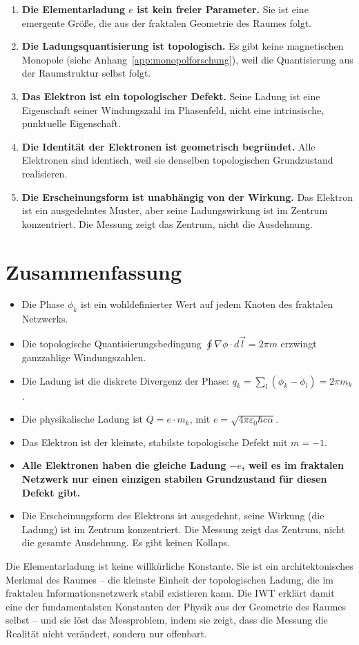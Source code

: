 \begin{enumerate}
    \item \textbf{Die Elementarladung \( e \) ist kein freier Parameter.} Sie ist eine emergente Größe, die aus der fraktalen Geometrie des Raumes folgt.
    \item \textbf{Die Ladungsquantisierung ist topologisch.} Es gibt keine magnetischen Monopole (siehe Anhang~\ref{app:monopolforschung}), weil die Quantisierung aus der Raumstruktur selbst folgt.
    \item \textbf{Das Elektron ist ein topologischer Defekt.} Seine Ladung ist eine Eigenschaft seiner Windungszahl im Phasenfeld, nicht eine intrinsische, punktuelle Eigenschaft.
    \item \textbf{Die Identität der Elektronen ist geometrisch begründet.} Alle Elektronen sind identisch, weil sie denselben topologischen Grundzustand realisieren.
    \item \textbf{Die Erscheinungsform ist unabhängig von der Wirkung.} Das Elektron ist ein ausgedehntes Muster, aber seine Ladungswirkung ist im Zentrum konzentriert. Die Messung zeigt das Zentrum, nicht die Ausdehnung.
\end{enumerate}

\section{Zusammenfassung}
\label{app:phasenquantisierung_zusammenfassung}

\begin{itemize}
    \item Die Phase \( \phi_k \) ist ein wohldefinierter Wert auf jedem Knoten des fraktalen Netzwerks.
    \item Die topologische Quantisierungsbedingung \( \oint \nabla \phi \cdot d\vec{l} = 2\pi m \) erzwingt ganzzahlige Windungszahlen.
    \item Die Ladung ist die diskrete Divergenz der Phase: \( q_k = \sum_l (\phi_k - \phi_l) = 2\pi m_k \).
    \item Die physikalische Ladung ist \( Q = e \cdot m_k \), mit \( e = \sqrt{4\pi\varepsilon_0 \hbar c \alpha} \).
    \item Das Elektron ist der kleinste, stabilste topologische Defekt mit \( m = -1 \).
    \item \textbf{Alle Elektronen haben die gleiche Ladung \( -e \), weil es im fraktalen Netzwerk nur einen einzigen stabilen Grundzustand für diesen Defekt gibt.}
    \item Die Erscheinungsform des Elektrons ist ausgedehnt, seine Wirkung (die Ladung) ist im Zentrum konzentriert. Die Messung zeigt das Zentrum, nicht die gesamte Ausdehnung. Es gibt keinen Kollaps.
\end{itemize}

Die Elementarladung ist keine willkürliche Konstante. Sie ist ein architektonisches Merkmal des Raumes – die kleinste Einheit der topologischen Ladung, die im fraktalen Informationsnetzwerk stabil existieren kann. Die IWT erklärt damit eine der fundamentalsten Konstanten der Physik aus der Geometrie des Raumes selbst – und sie löst das Messproblem, indem sie zeigt, dass die Messung die Realität nicht verändert, sondern nur offenbart.